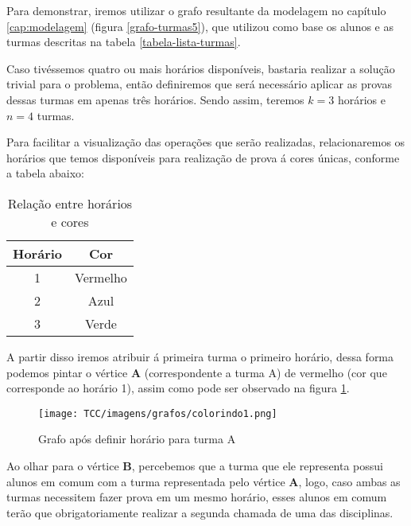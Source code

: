 Para demonstrar, iremos utilizar o grafo resultante da modelagem no capítulo \ref{cap:modelagem} (figura \ref{grafo-turmas5}), que utilizou como base os alunos e as turmas descritas na tabela \ref{tabela-lista-turmas}.

Caso tivéssemos quatro ou mais horários disponíveis, bastaria realizar a solução trivial para o problema, então definiremos que será necessário aplicar as provas dessas turmas em apenas três horários. Sendo assim, teremos $k = 3$ horários e $n = 4$ turmas.

Para facilitar a visualização das operações que serão realizadas, relacionaremos os horários que temos disponíveis para realização de prova á cores únicas, conforme a tabela abaixo:

\begin{table}[H]
    \centering
    \vspace{0.5cm}
    \renewcommand\arraystretch{1.5}
    \begin{tabular}{c|c}
     
        \textbf{Horário} & \textbf{Cor} \\ %
        \hline                               %
        	1 & Vermelho \\
2  & Azul \\
3 & Verde
        \\
        \hline
    \end{tabular}
    \caption{Relação entre horários e cores}
    \label{tabela-relacao2}
\end{table}


A partir disso iremos atribuir á primeira turma o primeiro horário, dessa forma podemos pintar o vértice \textbf{A} (correspondente a turma A) de vermelho (cor que corresponde ao horário 1), assim como pode ser observado na figura \ref{grafo-colorido1}.

\begin{figure}[H]
     \centering
     \texttt{[image: TCC/imagens/grafos/colorindo1.png]}
     \caption{Grafo após definir horário para turma A}
     \label{grafo-colorido1}
\end{figure}


Ao olhar para o vértice \textbf{B}, percebemos que a turma que ele representa possui alunos em comum com a turma representada pelo vértice \textbf{A}, logo, caso ambas as turmas necessitem fazer prova em um mesmo horário, esses alunos em comum terão que obrigatoriamente realizar a segunda chamada de uma das disciplinas.



